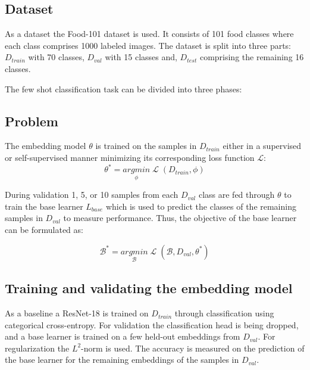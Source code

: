 \subsection{Dataset}
As a dataset the Food-101 dataset \cite{fleet_food-101_2014} is used. It consists of 101 food classes where 
each class comprises 1000 labeled images. The dataset is split into three parts: $D_{train}$ with 70 classes,
$D_{val}$ with 15 classes and, $D_{test}$ comprising the remaining 16 classes.

The few shot classification task can be divided into three phases:

\subsection{Problem}
The embedding model $\theta$ is trained on the samples in $D_{train}$ either in a supervised or self-supervised manner
minimizing its corresponding loss function $\mathcal{L}$:
\begin{equation}
	\theta^*= \underset{\phi}{argmin}\;{\mathcal{L}\;(D_{train}, \phi)}
\end{equation}

During validation 1, 5, or 10 samples from each $D_{val}$ class are fed through $\theta$ to train the 
base learner $L_{base}$ which is used to predict the classes of the remaining samples in $D_{val}$ 
to measure performance. Thus, the objective of the base learner can be formulated as:

\begin{equation}
	\mathcal{B}^* = \underset{\mathcal{B}}{argmin}\;{\mathcal{L}\;(\mathcal{B}, D_{val}, \theta^*)}
\end{equation}

\subsection{Training and validating the embedding model}
As a baseline a ResNet-18 is trained on $D_{train}$ through classification using 
categorical cross-entropy. For validation the classification 
head is being dropped, and a base learner is trained on a few held-out embeddings from $D_{val}$. 
For regularization the $L^2$-norm is used. The accuracy is 
measured on the prediction of the base learner for the remaining embeddings of the samples in $D_{val}$.

